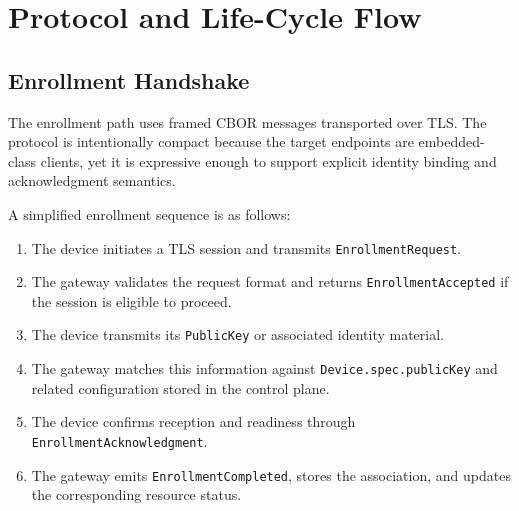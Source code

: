 \section{Protocol and Life-Cycle Flow}

\subsection{Enrollment Handshake}
The enrollment path uses framed CBOR messages transported over TLS. The protocol is intentionally compact because the target endpoints are embedded-class clients, yet it is expressive enough to support explicit identity binding and acknowledgment semantics.

A simplified enrollment sequence is as follows:
\begin{enumerate}
    \item The device initiates a TLS session and transmits \texttt{EnrollmentRequest}.
    \item The gateway validates the request format and returns \texttt{EnrollmentAccepted} if the session is eligible to proceed.
    \item The device transmits its \texttt{PublicKey} or associated identity material.
    \item The gateway matches this information against \texttt{Device.spec.publicKey} and related configuration stored in the control plane.
    \item The device confirms reception and readiness through \texttt{EnrollmentAcknowledgment}.
    \item The gateway emits \texttt{EnrollmentCompleted}, stores the association, and updates the corresponding resource status.
\end{enumerate}

